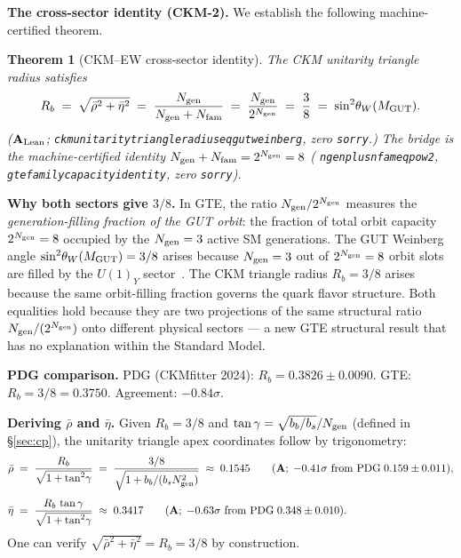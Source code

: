 \documentclass[11pt]{article}
\newtheorem{theorem}{Theorem}[section]
\theoremstyle{remark}
\newcommand{\Ngen}{N_{\rm gen}}
\newcommand{\Nfam}{N_{\rm fam}}
\newcommand{\lean}[1]{%
  \penalty-100
  \begingroup\def\_{\textunderscore\allowbreak}\texttt{#1}\endgroup}
\newcommand{\Rbar}{\bar{\rho}}
\newcommand{\Ebar}{\bar{\eta}}
\newcommand{\bs}{b_s}
\newcommand{\bb}{b_b}
\newcommand{\Rb}{R_b}
\newcommand{\sinwsq}{\sin^2\!\theta_W}
\newcommand{\CatA}{\textbf{A}}
\newcommand{\CatAL}{\ensuremath{\textbf{A}_{\rm Lean}}}
\begin{document}
\textbf{The cross-sector identity (CKM-2).}
We establish the following machine-certified theorem.

\begin{theorem}[CKM--EW cross-sector identity]\label{thm:cross_sector}
The CKM unitarity triangle radius satisfies
\begin{equation}\label{eq:Rb_gut}
  \Rb \;=\; \sqrt{\Rbar^2+\Ebar^2}
       \;=\; \frac{\Ngen}{\Ngen+\Nfam}
       \;=\; \frac{\Ngen}{2^{\Ngen}}
       \;=\; \frac{3}{8}
       \;=\; \sinwsq(M_{\rm GUT}).
\end{equation}
($\CatAL$; \lean{ckm\_unitarity\_triangle\_radius\_eq\_gut\_weinberg}, zero \texttt{sorry}.)
The bridge is the machine-certified identity
$\Ngen+\Nfam = 2^{\Ngen} = 8$
(\lean{ngen\_plus\_nfam\_eq\_pow2}, \lean{gte\_family\_capacity\_identity},
zero \texttt{sorry}).
\end{theorem}

\textbf{Why both sectors give $3/8$.}
In GTE, the ratio $\Ngen/2^{\Ngen}$ measures the \emph{generation-filling fraction of
the GUT orbit}: the fraction of total orbit capacity $2^{\Ngen} = 8$ occupied by the
$\Ngen = 3$ active SM generations.
The GUT Weinberg angle $\sinwsq(M_{\rm GUT}) = 3/8$ arises because $\Ngen = 3$ out of
$2^{\Ngen} = 8$ orbit slots are filled by the $U(1)_Y$ sector~\cite{SpivackWeinberg}.
The CKM triangle radius $\Rb = 3/8$ arises because the same orbit-filling fraction
governs the quark flavor structure.
Both equalities hold because they are two projections of the same structural ratio
$\Ngen/(2^{\Ngen})$ onto different physical sectors --- a new GTE structural result
that has no explanation within the Standard Model.

\medskip

\textbf{PDG comparison.}
PDG (CKMfitter 2024): $\Rb = 0.3826 \pm 0.0090$.
GTE: $\Rb = 3/8 = 0.3750$.  Agreement: $-0.84\sigma$.

\medskip

\textbf{Deriving $\Rbar$ and $\Ebar$.}
Given $\Rb = 3/8$ and $\tan\gamma = \sqrt{\bb/\bs}/\Ngen$ (defined in \S\ref{sec:cp}),
the unitarity triangle apex coordinates follow by trigonometry:
\begin{align}
  \Rbar &\;=\; \frac{\Rb}{\sqrt{1+\tan^2\!\gamma}}
         \;=\; \frac{3/8}{\sqrt{1 + \bb/(\bs\Ngen^2)}}
         \;\approx\; 0.1545
  \qquad (\CatA;\;-0.41\sigma\text{ from PDG}\;0.159\pm 0.011), \label{eq:rhobar}\\[4pt]
  \Ebar &\;=\; \frac{\Rb\,\tan\gamma}{\sqrt{1+\tan^2\!\gamma}}
         \;\approx\; 0.3417
  \qquad (\CatA;\;-0.63\sigma\text{ from PDG}\;0.348\pm 0.010). \label{eq:etabar}
\end{align}
One can verify $\sqrt{\Rbar^2+\Ebar^2} = \Rb = 3/8$ by construction.
\end{document}
